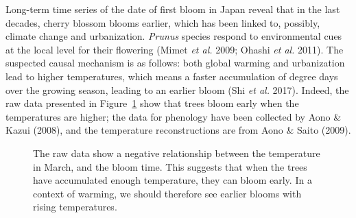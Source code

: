 \documentclass[
  letterpaper,
]{scrbook}
\begin{document}
Long-term time series of the date of first bloom in Japan reveal that in
the last decades, cherry blossom blooms earlier, which has been linked
to, possibly, climate change and urbanization. \emph{Prunus} species
respond to environmental cues at the local level for their flowering
(Mimet \emph{et al.} 2009; Ohashi \emph{et al.} 2011). The suspected
causal mechanism is as follows: both global warming and urbanization
lead to higher temperatures, which means a faster accumulation of degree
days over the growing season, leading to an earlier bloom (Shi \emph{et
al.} 2017). Indeed, the raw data presented in
Figure~\ref{fig-splits-rawdata} show that trees bloom early when the
temperatures are higher; the data for phenology have been collected by
Aono \& Kazui (2008), and the temperature reconstructions are from Aono
\& Saito (2009).

\begin{figure}[pbt]


\caption{\label{fig-splits-rawdata}The raw data show a negative
relationship between the temperature in March, and the bloom time. This
suggests that when the trees have accumulated enough temperature, they
can bloom early. In a context of warming, we should therefore see
earlier blooms with rising temperatures.}

\end{figure}%
\end{document}
